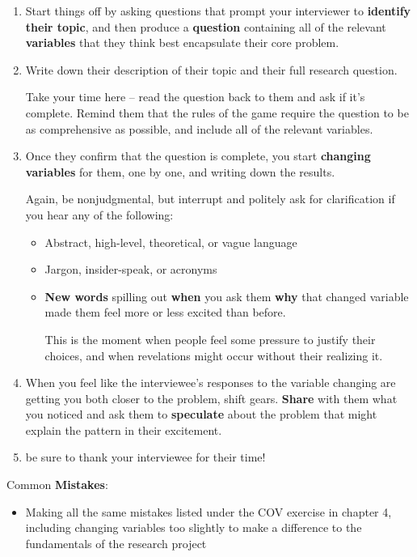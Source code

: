 \documentclass[11pt]{article}
\begin{document}
\begin{itemize}
\begin{exercise}
\begin{enumerate}
\item Start things off by asking questions that prompt your interviewer to \textbf{identify their topic}, and then produce a \textbf{question} containing all of the relevant \textbf{variables} that they think best encapsulate their core problem.

\item Write down their description of their topic and their full research question. 

Take your time here -- read the question back to them and ask if it’s complete. Remind them that the rules of the game require the question to be as comprehensive as possible, and include all of the relevant variables.

\item Once they confirm that the question is complete, you start \textbf{changing variables} for them, one by one, and writing down the results. 

Again, be nonjudgmental, but interrupt and politely ask for clarification if you hear any of the following:
\begin{itemize}
\item Abstract, high-level, theoretical, or vague language

\item Jargon, insider-speak, or acronyms

\item \textbf{New words} spilling out \textbf{when} you ask them \textbf{why} that changed variable made them feel more or less excited than before. 

This is the moment when people feel some pressure to justify their choices, and when revelations might occur without their realizing it. 
\end{itemize}

\item When you feel like the interviewee's responses to the variable changing are getting you both closer to the problem, shift gears. \textbf{Share} with them what you noticed and ask them to \textbf{speculate} about the problem that might explain the pattern in their excitement. 

\item be sure to thank your interviewee for their time!
\end{enumerate}
\end{exercise} 
Common \textbf{Mistakes}:
\begin{itemize}
\item Making all the same mistakes listed under the COV exercise in chapter 4, including changing variables too slightly to make a difference to the fundamentals of the research project


\end{itemize}
\end{itemize}
\end{document}
